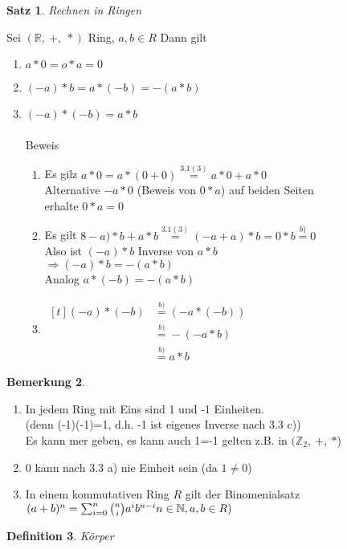 \documentclass[a4paper,11pt]{article}
\newtheorem{definition}{Definition}[section]
\newtheorem{satz}[definition]{Satz}
\newtheorem{bem}[definition]{Bemerkung}
\begin{document}
\newpage
\begin{satz}
Rechnen in Ringen
\end{satz}
Sei $(\mathbb{R},\:+,\:*)$ Ring, $a,b\in R$ Dann gilt
\begin{enumerate}[label=\alph*)]
\item $a*0=o*a=0$
\item $(-a)*b=a*(-b)=-(a*b)$
\item $(-a)*(-b)=a*b$ \\
\\
Beweis
\begin{enumerate}[label=\alph*)]
\item Es gilz $a*0=a*(0+0)\overset{3.1(3)}{=}a*0+a*0$ \\
Alternative $-a*0$ (Beweis von $0*a$) auf beiden Seiten \\
erhalte $0*a=0$
\item Es gilt $8-a)*b+a*b\overset{3.1(3)}{=}(-a+a)*b=0*b\overset{b)}{=}0$ \\
Also ist $(-a)*b$ Inverse von $a*b$ \\
$\Rightarrow (-a)*b=-(a*b)$ \\
\hspace*{5.5mm}Analog $a*(-b)=-(a*b)$
\item$\begin{aligned}[t]
(-a)*(-b)&\overset{b)}{=}(-a*(-b)) \\
&\overset{b)}{=}-(-a*b) \\
&\overset{b)}{=}a*b&&
\end{aligned}$
\end{enumerate}
\end{enumerate}
\begin{bem}
\end{bem}
\begin{enumerate}[label=\alph*)]
\item In jedem Ring mit Eins sind 1 und -1 Einheiten. \\
(denn (-1)(-1)=1, d.h. -1 ist eigenes Inverse nach 3.3 c)) \\
Es kann mer geben, es kann auch 1=-1 gelten z.B. in $(\mathbb{Z}_2,\:$\textcircled{$+$}$,\:$\textcircled{$*$}) 
\item 0 kann nach 3.3 a) nie Einheit sein (da $1\neq 0$)
\item In einem kommutativen Ring $R$ gilt der Binomenialsatz $(a+b)^n=\sum^n_{i=0}\binom{n}{i}a^ib^{n-i} \\
n\in\mathbb{N}, a,b\in R)$
\end{enumerate}
\begin{definition}
Körper
\end{definition}
\end{document}
